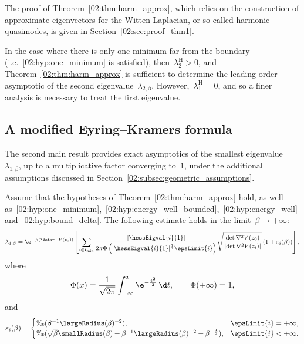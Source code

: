     The proof of Theorem~\ref{02:thm:harm_approx}, which relies on the construction of approximate eigenvectors for the Witten Laplacian, or so-called harmonic quasimodes, is given in Section~\ref{02:sec:proof_thm1}.
    
    In the case where there is only one minimum far from the boundary (i.e.~\eqref{02:hyp:one_minimum} is satisfied), then~$\lambda_2^{\mathrm{H}}>0$, and Theorem~\ref{02:thm:harm_approx} is sufficient to determine the leading-order asymptotic of the second eigenvalue~$\lambda_{2,\beta}$. However,~$\lambda_1^{\mathrm{H}}=0$, and so a finer analysis is necessary to treat the first eigenvalue.
    
    \subsection{A modified Eyring--Kramers formula}
    \label{02:subsec:ek}
    The second main result provides exact asymptotics of the smallest eigenvalue~$\lambda_{1,\beta}$, up to a multiplicative factor converging to~$1$, under the additional assumptions discussed in Section~\ref{02:subsec:geometric_assumptions}.
    \begin{theorem}
        \label{02:thm:eyring_kramers}
        Assume that the hypotheses of Theorem~\ref{02:thm:harm_approx} hold, as well as~\eqref{02:hyp:one_minimum},~\eqref{02:hyp:energy_well_bounded},~\eqref{02:hyp:energy_well} and~\eqref{02:hyp:bound_delta}.
        The following estimate holds in the limit~$\beta\to+\infty$:
        \begin{equation}
            \label{02:eq:eyring_kramers}
            \lambda_{1,\beta} = \e^{-\beta(\Vstar-V(z_0))} \left[\sum_{i\in I_{\min}} \frac{|\hessEigval{i}{1}|}{2\pi\Phi\left(|\hessEigval{i}{1}|^{\frac12}\epsLimit{i}\right)}\sqrt{\frac{\det \nabla^2 V(z_0)}{\left|\det \nabla ^2 V(z_i)\right|}} \left(1 +\varepsilon_i(\beta)\right)\right],
        \end{equation}
        where
        \begin{equation}
            \label{02:eq:gaussian_cdf}
            \Phi(x) =  \displaystyle\frac1{\sqrt{2\pi}}\displaystyle\int_{-\infty}^x\e^{-\frac{t^2}2}\,\d t,\qquad \Phi(+\infty) = 1,
        \end{equation}
        and
        \begin{equation}
            \label{02:eq:eyring_kramers_error}
            \varepsilon_i(\beta) =\begin{cases}\O(\beta^{-1}\largeRadius(\beta)^{-2}),&\epsLimit{i}=+\infty,\\
                \O(\sqrt\beta\smallRadius(\beta)+\beta^{-1}\largeRadius(\beta)^{-2}+\beta^{-\frac12}),&\epsLimit{i}<+\infty.\end{cases}
        \end{equation}
    \end{theorem}
